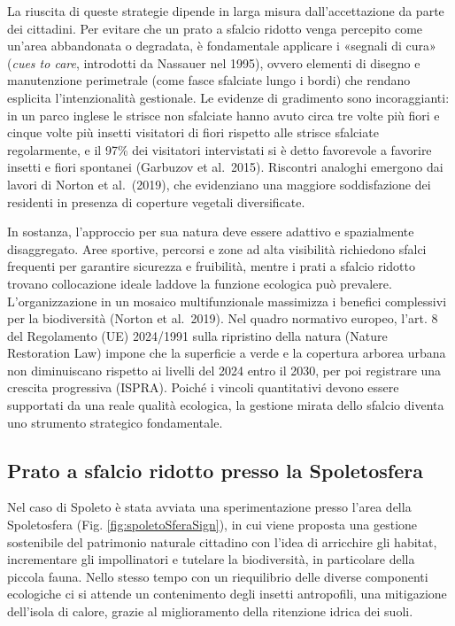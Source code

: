 \documentclass[
  a4paper,
]{book}
\begin{document}
La riuscita di queste strategie dipende in larga misura dall'accettazione da parte dei cittadini. Per evitare che un prato a sfalcio ridotto venga percepito come un'area abbandonata o degradata, è fondamentale applicare i «segnali di cura» (\emph{cues to care}, introdotti da Nassauer nel 1995), ovvero elementi di disegno e manutenzione perimetrale (come fasce sfalciate lungo i bordi) che rendano esplicita l'intenzionalità gestionale. Le evidenze di gradimento sono incoraggianti: in un parco inglese le strisce non sfalciate hanno avuto circa tre volte più fiori e cinque volte più insetti visitatori di fiori rispetto alle strisce sfalciate regolarmente, e il 97\% dei visitatori intervistati si è detto favorevole a favorire insetti e fiori spontanei (Garbuzov et al.~2015). Riscontri analoghi emergono dai lavori di Norton et al.~(2019), che evidenziano una maggiore soddisfazione dei residenti in presenza di coperture vegetali diversificate.

In sostanza, l'approccio per sua natura deve essere adattivo e spazialmente disaggregato. Aree sportive, percorsi e zone ad alta visibilità richiedono sfalci frequenti per garantire sicurezza e fruibilità, mentre i prati a sfalcio ridotto trovano collocazione ideale laddove la funzione ecologica può prevalere. L'organizzazione in un mosaico multifunzionale massimizza i benefici complessivi per la biodiversità (Norton et al.~2019).
Nel quadro normativo europeo, l'art. 8 del Regolamento (UE) 2024/1991 sulla ripristino della natura (Nature Restoration Law) impone che la superficie a verde e la copertura arborea urbana non diminuiscano rispetto ai livelli del 2024 entro il 2030, per poi registrare una crescita progressiva (ISPRA). Poiché i vincoli quantitativi devono essere supportati da una reale qualità ecologica, la gestione mirata dello sfalcio diventa uno strumento strategico fondamentale.

\subsection{Prato a sfalcio ridotto presso la Spoletosfera}\label{prato-a-sfalcio-ridotto-presso-la-spoletosfera}

Nel caso di Spoleto è stata avviata una sperimentazione presso l'area della Spoletosfera (Fig. \ref{fig:spoletoSferaSign}), in cui viene proposta una gestione sostenibile del patrimonio naturale cittadino con l'idea di arricchire gli habitat, incrementare gli impollinatori e tutelare la biodiversità, in particolare della piccola fauna. Nello stesso tempo con un riequilibrio delle diverse componenti ecologiche ci si attende un contenimento degli insetti antropofili, una mitigazione dell'isola di calore, grazie al miglioramento della ritenzione idrica dei suoli.
\end{document}
